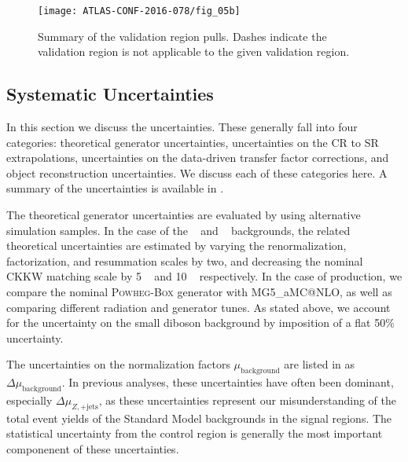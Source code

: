 \begin{figure}[tbp]
\caption{Summary of the validation region pulls.
Dashes indicate the validation region is not applicable to the given validation region.} \label{fig:vr_summary}
\texttt{[image: ATLAS-CONF-2016-078/fig\_05b]}
\end{figure}

\subsection{Systematic Uncertainties}

In this section we discuss the uncertainties.
These generally fall into four categories: theoretical generator uncertainties, uncertainties on the CR to SR extrapolations, uncertainties on the data-driven transfer factor corrections, and object reconstruction uncertainties.
We discuss each of these categories here.
A summary of the uncertainties is available in .


The theoretical generator uncertainties are evaluated by using alternative simulation samples.
In the case of the \zjets~ and \wjets~ backgrounds, the related theoretical uncertainties are estimated by varying the renormalization, factorization, and resummation scales by two, and decreasing the nominal CKKW matching scale by 5 \GeV~ and 10 \GeV~ respectively.
In the case of \ttbar production, we compare the nominal \textsc{Powheg-Box} generator with MG5\_aMC@NLO, as well as comparing different radiation and generator tunes.
As stated above, we account for the uncertainty on the small diboson background by imposition of a flat 50\% uncertainty.

The uncertainties on the normalization factors $\mu_{\text{background}}$ are listed in  as $\Delta\mu_{\text{background}}$.
In previous analyses, these uncertainties have often been dominant, especially $\Delta\mu_{Z,\mathrm{+jets}}$, as these uncertainties represent our misunderstanding of the total event yields of the Standard Model backgrounds in the signal regions.
The statistical uncertainty from the control region is generally the most important componenent of these uncertainties.

